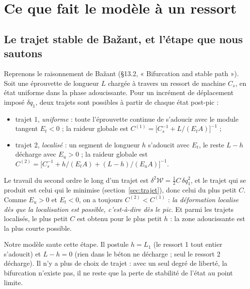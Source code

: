 \documentclass[11pt,a4paper]{article}
\newcommand{\dW}{\delta^2\mathcal W}
\begin{document}
\section{Ce que fait le modèle à un ressort}

\subsection{Le trajet stable de Bažant, et l'étape que nous sautons}
Reprenons le raisonnement de Bažant (§13.2, « Bifurcation and stable path »). Soit une
éprouvette de longueur $L$ chargée à travers un ressort de machine $C_s$, en état uniforme
dans la phase adoucissante. Pour un incrément de déplacement imposé $\delta q_1$, deux trajets
sont possibles à partir de chaque état post-pic :
\begin{itemize}[nosep]
  \item trajet 1, \emph{uniforme} : toute l'éprouvette continue de s'adoucir avec le module
        tangent $E_t < 0$ ; la raideur globale est
        $C^{(1)} = \bigl[C_s^{-1} + L/(E_tA)\bigr]^{-1}$ ;
  \item trajet 2, \emph{localisé} : un segment de longueur $h$ s'adoucit avec $E_t$, le reste
        $L-h$ décharge avec $E_u > 0$ ; la raideur globale est
        $C^{(2)} = \bigl[C_s^{-1} + h/(E_tA) + (L-h)/(E_uA)\bigr]^{-1}$.
\end{itemize}
Le travail du second ordre le long d'un trajet est $\dW = \tfrac12C\,\delta q_1^2$, et le trajet
qui se produit est celui qui le minimise (section~\ref{sec:trajet}), donc celui du plus petit
$C$. Comme $E_u > 0$ et $E_t < 0$, on a toujours $C^{(2)} < C^{(1)}$ : \emph{la déformation
localise dès que la localisation est possible, c'est-à-dire dès le pic}. Et parmi les trajets
localisés, le plus petit $C$ est obtenu pour le plus petit $h$ : la zone adoucissante est la
plus courte possible.

Notre modèle saute cette étape. Il postule $h = L_1$ (le ressort 1 tout entier s'adoucit) et
$L - h = 0$ (rien dans le béton ne décharge ; seul le ressort 2 décharge). Il n'y a plus de
choix de trajet : avec un seul degré de liberté, la bifurcation n'existe pas, il ne reste que
la perte de stabilité de l'état au point limite.
\end{document}
